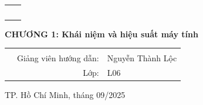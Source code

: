 \begin{titlepage}
\begin{center}
\begin{tabular}{c}
~~\\
\end{tabular}
\end{center}
\begin{center}
{\textbf{{\huge CHƯƠNG 1: Khái niệm và hiệu suất máy tính }}}\\
\end{center}


\begin{center}
\begin{table}[h]
\large
    \begin{tabular}{rrl}
        \hspace{2.5 cm} &  &\\

        & Giảng viên hướng dẫn: & Nguyễn Thành Lộc\\[0.2cm]
        & Lớp: & L06\\[0.2cm]
    \end{tabular}
\end{table}
\end{center}
\vspace{2cm}
\centerline{\large TP. Hồ Chí Minh, tháng 09/2025}
\end{titlepage}